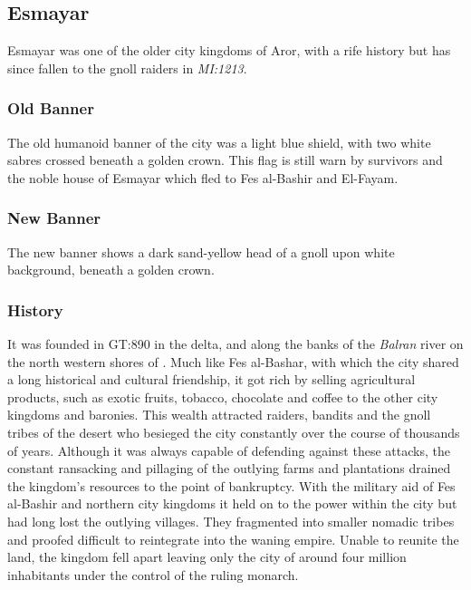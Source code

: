\subsection{Esmayar}
\label{sec:Esmayar}

Esmayar was one of the older city kingdoms of Aror, with a rife history but has
since fallen to the gnoll raiders in \emph{MI:1213}.

\subsubsection{Old Banner}

The old humanoid banner of the city was a light blue shield, with two white
sabres crossed beneath a golden crown. This flag is still warn by survivors and
the noble house of Esmayar which fled to Fes al-Bashir and El-Fayam.

\subsubsection{New Banner}

The new banner shows a dark sand-yellow head of a gnoll upon white background,
beneath a golden crown.

\subsubsection{History}

It was founded in GT:890 in the delta, and along the banks of the \emph{Balran}
river on the north western shores of . Much like Fes
al-Bashar, with which the city shared a long historical and cultural
friendship, it got rich by selling agricultural products, such as exotic
fruits, tobacco, chocolate and coffee to the other city kingdoms and
baronies. This wealth attracted raiders, bandits and the gnoll tribes of the
desert who besieged the city constantly over the course of thousands of
years. Although it was always capable of defending against these attacks, the
constant ransacking and pillaging of the outlying farms and plantations
drained the kingdom's resources to the point of bankruptcy. With the military
aid of Fes al-Bashir and northern city kingdoms it held on to the power within
the city but had long lost the outlying villages. They fragmented into smaller
nomadic tribes and proofed difficult to reintegrate into the waning
empire. Unable to reunite the land, the kingdom fell apart leaving only the
city of around four million inhabitants under the control of the ruling
monarch.

